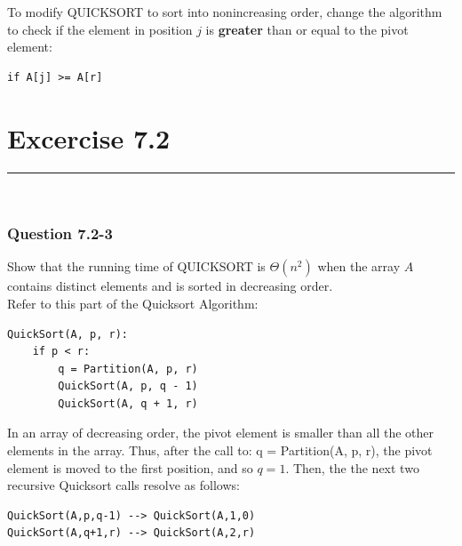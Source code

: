 \documentclass[11pt]{article}
\begin{document}
To modify QUICKSORT to sort into nonincreasing order, change the algorithm to check if the element in position $j$ is \textbf{greater} than or equal to the pivot element:
\begin{center}  
\begin{minipage}{3in}
\begin{lstlisting}
if A[j] >= A[r]
\end{lstlisting}
\end{minipage}
\end{center}

\vspace{20pt}


\section*{Excercise 7.2}\nointerlineskip
\noindent \rule{\linewidth}{0.01pt}\\

\subsubsection*{Question 7.2-3}\nointerlineskip
Show that the running time of QUICKSORT is $\Theta(n^2)$ when the array $A$ contains distinct elements and is sorted in decreasing order.\\

Refer to this part of the Quicksort Algorithm:
\begin{center}  
\begin{minipage}{3in}
\begin{lstlisting}
QuickSort(A, p, r):
    if p < r:
        q = Partition(A, p, r)
        QuickSort(A, p, q - 1)
        QuickSort(A, q + 1, r)
\end{lstlisting}
\end{minipage}
\end{center}



In an array of decreasing order, the pivot element is smaller than all the other elements in the array. Thus, after the call to:  q = Partition(A, p, r), the pivot element is moved to the first position, and so $q=1$. Then, the the next two recursive Quicksort calls resolve as follows:
\begin{center}  
\begin{minipage}{4in}
\begin{lstlisting}
QuickSort(A,p,q-1) --> QuickSort(A,1,0)
QuickSort(A,q+1,r) --> QuickSort(A,2,r)
\end{lstlisting}
\end{minipage}
\end{center}
\end{document}
